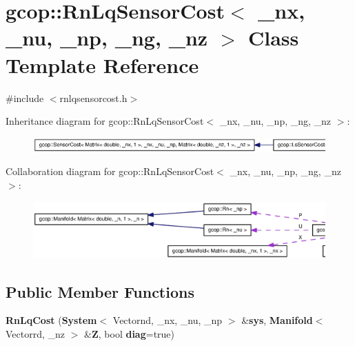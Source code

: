 \section{gcop\-:\-:\-Rn\-Lq\-Sensor\-Cost$<$ \-\_\-nx, \-\_\-nu, \-\_\-np, \-\_\-ng, \-\_\-nz $>$ \-Class \-Template \-Reference}
\label{classgcop_1_1RnLqSensorCost}


{\ttfamily \#include $<$rnlqsensorcost.\-h$>$}



\-Inheritance diagram for gcop\-:\-:\-Rn\-Lq\-Sensor\-Cost$<$ \-\_\-nx, \-\_\-nu, \-\_\-np, \-\_\-ng, \-\_\-nz $>$\-:\nopagebreak
\begin{figure}[H]
\begin{center}
\leavevmode
\includegraphics[width=350pt]{classgcop_1_1RnLqSensorCost__inherit__graph}
\end{center}
\end{figure}


\-Collaboration diagram for gcop\-:\-:\-Rn\-Lq\-Sensor\-Cost$<$ \-\_\-nx, \-\_\-nu, \-\_\-np, \-\_\-ng, \-\_\-nz $>$\-:\nopagebreak
\begin{figure}[H]
\begin{center}
\leavevmode
\includegraphics[width=350pt]{classgcop_1_1RnLqSensorCost__coll__graph}
\end{center}
\end{figure}
\subsection*{\-Public \-Member \-Functions}
\begin{DoxyCompactItemize}
\item 
{\bf \-Rn\-Lq\-Cost} ({\bf \-System}$<$ \-Vectornd, \-\_\-nx, \-\_\-nu, \-\_\-np $>$ \&{\bf sys}, {\bf \-Manifold}$<$ \-Vectorrd, \-\_\-nz $>$ \&{\bf \-Z}, bool {\bf diag}=true)
\end{DoxyCompactItemize}


